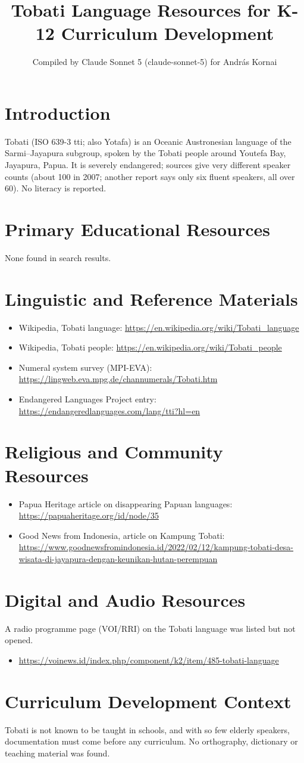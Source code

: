 \documentclass[12pt]{article}
\title{Tobati Language Resources for K-12 Curriculum Development}
\author{Compiled by Claude Sonnet 5 (claude-sonnet-5) for Andr\'as Kornai}
\date{}
\begin{document}
\maketitle
\section{Introduction}
Tobati (ISO 639-3 tti; also Yotafa) is an Oceanic Austronesian language of the Sarmi--Jayapura subgroup, spoken by the Tobati people around Youtefa Bay, Jayapura, Papua. It is severely endangered; sources give very different speaker counts (about 100 in 2007; another report says only six fluent speakers, all over 60). No literacy is reported.
\section{Primary Educational Resources}
None found in search results.
\section{Linguistic and Reference Materials}
\begin{itemize}
\item Wikipedia, Tobati language: \url{https://en.wikipedia.org/wiki/Tobati_language}
\item Wikipedia, Tobati people: \url{https://en.wikipedia.org/wiki/Tobati_people}
\item Numeral system survey (MPI-EVA): \url{https://lingweb.eva.mpg.de/channumerals/Tobati.htm}
\item Endangered Languages Project entry: \url{https://endangeredlanguages.com/lang/tti?hl=en}
\end{itemize}
\section{Religious and Community Resources}
\begin{itemize}
\item Papua Heritage article on disappearing Papuan languages: \url{https://papuaheritage.org/id/node/35}
\item Good News from Indonesia, article on Kampung Tobati: \url{https://www.goodnewsfromindonesia.id/2022/02/12/kampung-tobati-desa-wisata-di-jayapura-dengan-keunikan-hutan-perempuan}
\end{itemize}
\section{Digital and Audio Resources}
A radio programme page (VOI/RRI) on the Tobati language was listed but not opened.
\begin{itemize}
\item \url{https://voinews.id/index.php/component/k2/item/485-tobati-language}
\end{itemize}
\section{Curriculum Development Context}
Tobati is not known to be taught in schools, and with so few elderly speakers, documentation must come before any curriculum. No orthography, dictionary or teaching material was found.
\end{document}
